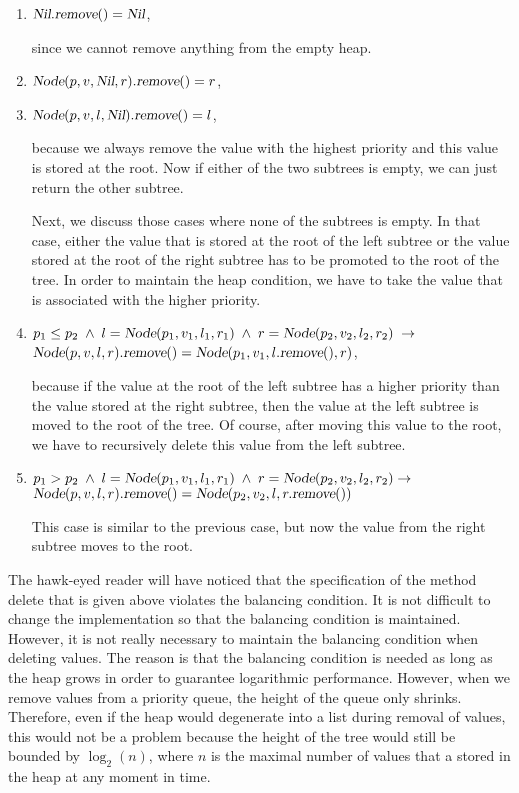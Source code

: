 \begin{enumerate}
\item $\textsl{Nil}.\textsl{remove}() = \textsl{Nil}$,

      since we cannot remove anything from the empty heap.
\item $\textsl{Node}(p,v,\textsl{Nil},r).\textsl{remove}() = r$,
  
\item $\textsl{Node}(p,v,l,\textsl{Nil}).\textsl{remove}() = l$,

      because we always remove the value with the highest priority and this value is stored at the
      root.  Now if either of the two subtrees is empty, we can just return the other subtree.

      Next, we discuss those cases where none of the subtrees is empty.
      In that case, either the value that is stored at the root of the left subtree or the value
      stored at the root of the right subtree has to be promoted to the root of the tree.
      In order to maintain the heap condition, we have to take the value that is associated with the
      higher priority.
\item $p_1 \leq p_2 \;\wedge\; l = \textsl{Node}(p_1,v_1,l_1,r_1) \;\wedge\; r =
      \textsl{Node}(p_2,v_2,l_2,r_2) \;\rightarrow$ \\[0.1cm] 
      \hspace*{1.3cm} 
      $\textsl{Node}(p,v,l,r).\textsl{remove}() =      \textsl{Node}(p_1,v_1,l.\textsl{remove}(),r)$,

      because if the value at the root of the left subtree has a higher priority than the value
      stored at the right subtree, then the value at the left subtree is moved to the root of the tree.
      Of course, after moving this value to the root, we have to recursively delete this value from
      the left subtree.
\item $p_1 > p_2 \;\wedge\; l = \textsl{Node}(p_1,v_1,l_1,r_1) \;\wedge\; r = \textsl{Node}(p_2,v_2,l_2,r_2) \rightarrow$ \\[0.1cm]
      \hspace*{1.3cm} 
      $\textsl{Node}(p,v,l,r).\textsl{remove}() = \textsl{Node}(p_2,v_2,l,r.\textsl{remove}())$

      This case is similar to the previous case, but now the value from the right subtree moves to
      the root.
\end{enumerate}
The hawk-eyed reader will have noticed that the specification of the method delete that is given
above violates the balancing condition.  It is not difficult to change the implementation so that
the balancing condition is maintained.  However, it is not really necessary to maintain the
balancing condition when deleting values.  The reason is that the balancing condition is needed as
long as the heap grows in order to guarantee logarithmic  performance.  However, when we remove
values from a priority queue, the height of the queue only shrinks.  Therefore, even if the heap
would degenerate into a list during removal of values, this would not be a problem because the
height of the tree would still be bounded by $\log_2(n)$, where $n$ is the maximal number of
values that a stored in the heap at any moment in time.

